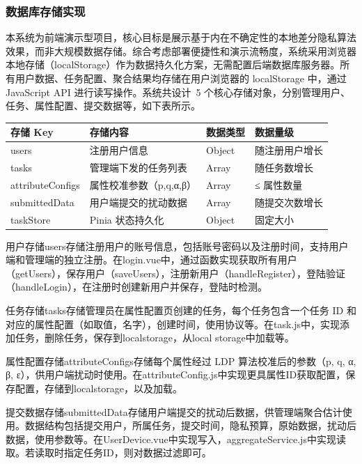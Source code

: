 \documentclass{cumcmthesis}
\numberwithin{equation}{section}
\numberwithin{figure}{section}
\numberwithin{table}{section}
\begin{document}
\subsubsection{数据库存储实现}

本系统为前端演示型项目，核心目标是展示基于内在不确定性的本地差分隐私算法效果，而非大规模数据存储。综合考虑部署便捷性和演示流畅度，系统采用浏览器本地存储（localStorage）作为数据持久化方案，无需配置后端数据库服务器。所有用户数据、任务配置、聚合结果均存储在用户浏览器的 localStorage 中，通过 JavaScript API 进行读写操作。系统共设计 5 个核心存储对象，分别管理用户、任务、属性配置、提交数据等，如下表所示。

\begin{table}[htbp]
\centering
\small
\begin{tabularx}{\textwidth}{|>{\raggedright\arraybackslash}X|>{\raggedright\arraybackslash}X|>{\raggedright\arraybackslash}X|>{\raggedright\arraybackslash}X|}
\hline
存储 Key & 存储内容 & 数据类型 & 数据量级 \\ \hline
users & 注册用户信息 & Object & 随注册用户增长 \\ \hline
tasks & 管理端下发的任务列表 & Array & 随任务数增长 \\ \hline
attributeConfigs & 属性校准参数（p,q,α,β） & Array & ≤ 属性数量 \\ \hline
submittedData & 用户端提交的扰动数据 & Array & 随提交次数增长 \\ \hline
taskStore & Pinia 状态持久化 & Object & 固定大小 \\ \hline
\end{tabularx}
\end{table}

用户存储users存储注册用户的账号信息，包括账号密码以及注册时间，支持用户端和管理端的独立注册。在login.vue中，通过函数实现获取所有用户（getUsers），保存用户（saveUsers），注册新用户（handleRegister），登陆验证（handleLogin），在注册时创建新用户并保存，登陆时检测。

任务存储tasks存储管理员在属性配置页创建的任务，每个任务包含一个任务 ID 和对应的属性配置（如取值，名字），创建时间，使用协议等。在task.js中，实现添加任务，删除任务，保存到localstorage，从local storage中加载等。

属性配置存储attributeConfigs存储每个属性经过 LDP 算法校准后的参数（p, q, α, β, ε），供用户端扰动时使用。在attributeConfig.js中实现更具属性ID获取配置，保存配置，存储到localstorage，以及加载。

提交数据存储submittedData存储用户端提交的扰动后数据，供管理端聚合估计使用。数据结构包括提交用户，所属任务，提交时间，隐私预算，原始数据，扰动后数据，使用参数等。在UserDevice.vue中实现写入，aggregateService.js中实现读取。若读取时指定任务ID，则对数据过滤即可。
\end{document}
